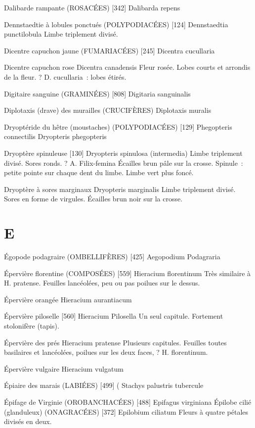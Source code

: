 \documentclass[book,12pt,a4paper,onecolumn,openany]{memoir}
\begin{document}
Dalibarde rampante (ROSACÉES)  [342]
				Dalibarda repens

Dennstaedtie à lobules ponctués (POLYPODIACÉES) [124]
				Dennstaedtia punctilobula
Limbe triplement divisé.

Dicentre capuchon jaune (FUMARIACÉES)  [245]
				Dicentra cucullaria

Dicentre capuchon rose
				Dicentra canadensis
Fleur rosée. Lobes courts et arrondis de la fleur. ? D. cucullaria : lobes étirés.

Digitaire sanguine (GRAMINÉES)  [808]
				Digitaria sanguinalis

Diplotaxis (drave) des murailles  (CRUCIFÈRES)
				Diplotaxis muralis



Dryoptéride du hêtre (moustaches) (POLYPODIACÉES)  [129]
				Phegopteris connectilis
				Dryopteris phegopteris

Dryoptère spinuleuse  [130]
				Dryopteris spinulosa (intermedia)
Limbe triplement divisé. Sores ronds.
? A. Filix-femina
Écailles brun pâle sur la crosse.
Spinule : petite pointe sur chaque dent du limbe.
Limbe vert plus foncé.

Dryoptère à sores marginaux
				Dryopteris marginalis
Limbe triplement divisé. Sores en forme de virgules.
Écailles brun noir sur la crosse.

\chapter*{E}

Égopode podagraire (OMBELLIFÈRES)  [425]
				Aegopodium Podagraria



Épervière florentine (COMPOSÉES)  [559]
				Hieracium florentinum
Très similaire à H. pratense. Feuilles lancéolées, peu ou pas poilues sur le dessus.

Épervière orangée
				Hieracium aurantiacum

Épervière piloselle  [560]
				Hieracium Pilosella
Un seul capitule. Fortement stolonifère (tapis).

Épervière des prés
				Hieracium pratense
Plusieurs capitules. Feuilles toutes basilaires et lancéolées, poilues sur les deux faces, ? H. florentinum.

Épervière vulgaire
				Hieracium vulgatum

Épiaire des marais (LABIÉES)  [499]				(
				Stachys palustris			tubercule

Épifage de Virginie (OROBANCHACÉES)  [488]
				Epifagus virginiana
Épilobe cilié (glanduleux) (ONAGRACÉES)  [372]
				Epilobium ciliatum
Fleurs à quatre pétales divisés en deux.
\end{document}

